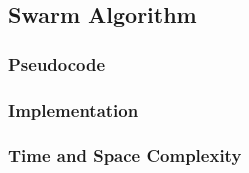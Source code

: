 \subsection{Swarm Algorithm}

\subsubsection{Pseudocode}

\subsubsection{Implementation}

\subsubsection{Time and Space Complexity}

